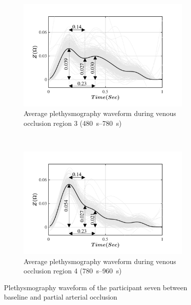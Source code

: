 \begin{figure}[!htbp]
	\centering
	\begin{subfigure}[t]{0.48\textwidth}
		\centering
		\includegraphics[height=5.5cm, trim={0.5cm 0cm 1.5cm 0 cm}, clip]{figure_apa_4a}
		\caption{Average plethysmography waveform during venous occlusion region 3 (\SIrange{480}{780}{\second})}
		\label{fig:iPG_arterial_baseline}
	\end{subfigure}%
	~ 
	\begin{subfigure}[t]{0.48\textwidth}
		\centering
		\includegraphics[height=5.5cm, trim={0.5cm 0cm 1.5cm 0 cm}, clip]{figure_apa_4b}
		\caption{Average plethysmography waveform during venous occlusion region 4 (\SIrange{780}{960}{\second})}
		\label{fig:iPG_arterial_occlusion}
	\end{subfigure}
	\caption{Plethysmography waveform of the participant seven between baseline and partial arterial occlusion}
	\label{fig:iPG_arterial}
\end{figure}

